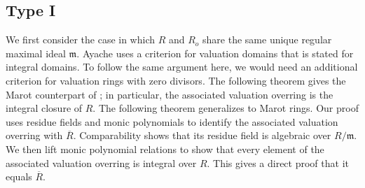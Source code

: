\documentclass[12pt]{article}
\begin{document}
\subsection{Type I}\label{subsec-type-i}
	We first consider the case in which $R$ and $R_o$ share the same unique regular maximal ideal $\mathfrak m$. Ayache uses a criterion for valuation domains that is stated for integral domains. To follow the same argument here, we would need an additional criterion for valuation rings with zero divisors. The following theorem gives the Marot counterpart of \cite[Theorem 20]{ayache}; in particular, the associated valuation overring is the integral closure of $R$. The following theorem generalizes \cite[Theorem 20]{ayache} to Marot rings. Our proof uses residue fields and monic polynomials to identify the associated valuation overring with $\overline R$. Comparability shows that its residue field is algebraic over $R/\mathfrak m$. We then lift monic polynomial relations to show that every element of the associated valuation overring is integral over $R$. This gives a direct proof that it equals $\overline R$.
\end{document}
